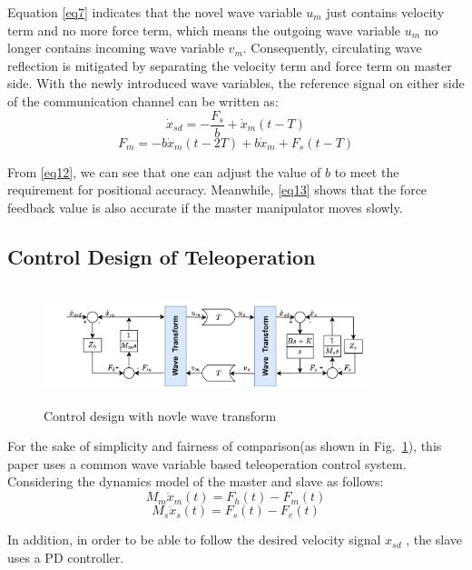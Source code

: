 \par Equation \eqref{eq7} indicates that the novel wave variable $u_m$ just contains velocity term 
and no more force term,
which means the outgoing wave variable $u_m$ no longer 
contains incoming wave variable $v_m$.
Consequently, circulating wave reflection is 
mitigated by separating the velocity term and force term on master side.
With the newly introduced wave variables,
the reference signal on either 
side of the communication channel can be written as:
\begin{equation}
    {{{\dot{x}}}_{sd}}=-\frac{{{F}_{s}}}{b}+{{{\dot{x}}}_{m}}(t-T)  \label{eq12}
\end{equation}
\begin{equation}
    {{F}_{m}}=-b{{{\dot{x}}}_{m}}(t-2T)+b{{{\dot{x}}}_{m}}+{{F}_{s}}(t-T) \label{eq13}
\end{equation}
\par From \eqref{eq12},
we can see that one can adjust the value of $b$
to meet the requirement for positional accuracy.
Meanwhile, \eqref{eq13} shows that the force feedback value 
is also accurate if the master manipulator moves slowly.


\subsection{Control Design of Teleoperation}
\begin{figure}[htbp]
    \centerline{\includegraphics[height=3.4cm,width=9.4cm]{over_schemal.jpg}}
    \caption{Control design with novle wave transform}
    \label{fig4}
\end{figure}
\par For the sake of simplicity and fairness of comparison(as shown in Fig.~\ref{fig4}),
this paper uses a common wave variable based teleoperation control system.
Considering the dynamics model of the master and slave as follows:
\begin{equation}
    M_m \ddot x_m(t) = F_h(t)-F_m(t) \label{eqC}
\end{equation}
\begin{equation}
    M_s \ddot x_s(t) = F_s(t)-F_e(t) \label{eq14}
\end{equation}
\par In addition,
in order to be able to follow the desired velocity signal $x_{sd}$ 
, the slave uses a PD controller.

